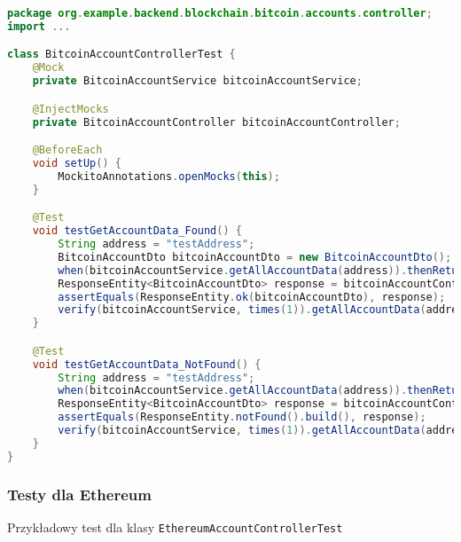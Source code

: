 \begin{lstlisting}[language=Java, style=JavaStyle]
package org.example.backend.blockchain.bitcoin.accounts.controller;
import ...

class BitcoinAccountControllerTest {
    @Mock
    private BitcoinAccountService bitcoinAccountService;

    @InjectMocks
    private BitcoinAccountController bitcoinAccountController;

    @BeforeEach
    void setUp() {
        MockitoAnnotations.openMocks(this);
    }

    @Test
    void testGetAccountData_Found() {
        String address = "testAddress";
        BitcoinAccountDto bitcoinAccountDto = new BitcoinAccountDto();
        when(bitcoinAccountService.getAllAccountData(address)).thenReturn(bitcoinAccountDto);
        ResponseEntity<BitcoinAccountDto> response = bitcoinAccountController.getAccountData(address);
        assertEquals(ResponseEntity.ok(bitcoinAccountDto), response);
        verify(bitcoinAccountService, times(1)).getAllAccountData(address);
    }

    @Test
    void testGetAccountData_NotFound() {
        String address = "testAddress";
        when(bitcoinAccountService.getAllAccountData(address)).thenReturn(null);
        ResponseEntity<BitcoinAccountDto> response = bitcoinAccountController.getAccountData(address);
        assertEquals(ResponseEntity.notFound().build(), response);
        verify(bitcoinAccountService, times(1)).getAllAccountData(address);
    }
}
\end{lstlisting}

\subsubsection{Testy dla Ethereum}
Przykładowy test dla klasy \texttt{EthereumAccountControllerTest}

